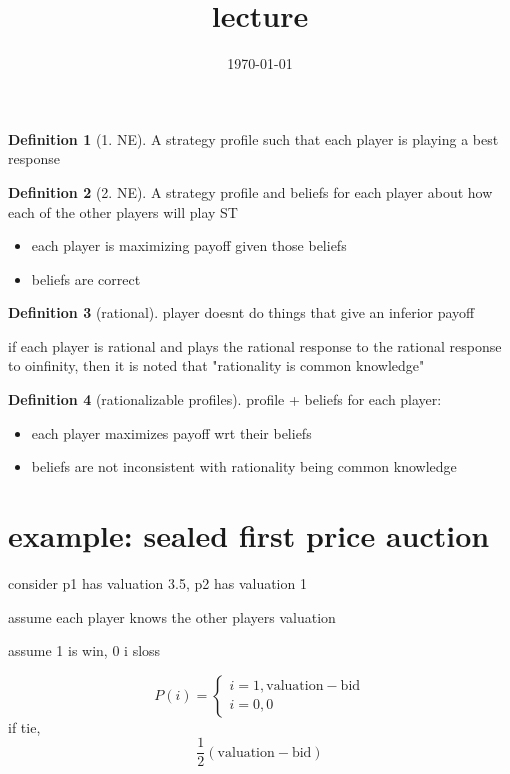 \documentclass{article}
\title{lecture}
\date{\today}
\theoremstyle{definition}
\newtheorem{definition}{Definition}
\begin{document}
\maketitle

\begin{definition}[1. NE]
    A strategy profile such that each player is playing a best response
\end{definition}

\begin{definition}[2. NE]
    A strategy profile and beliefs for each player about how each of the other players will play ST
    \begin{itemize}
        \item each player is maximizing payoff given those beliefs
        \item beliefs are correct
    \end{itemize}
\end{definition}


\begin{definition}[rational]
    player doesnt do things that give an inferior payoff
\end{definition}

if each player is rational and plays the rational response to the rational response to oinfinity, then it is noted that "rationality is common knowledge"

\begin{definition}[rationalizable profiles]
    profile + beliefs for each player:
    \begin{itemize}
        \item each player maximizes payoff wrt their beliefs
        \item beliefs are not inconsistent with rationality being common knowledge
    \end{itemize}
\end{definition}


\section{example: sealed first price auction}

consider p1 has valuation 3.5, p2 has valuation 1

assume each player knows the other players valuation

assume 1 is win, 0 i sloss

\begin{equation}
    P(i)=\begin{cases}
        i=1, \text{valuation}-\text{bid}\\
        i=0, 0
    \end{cases}
\end{equation}
if tie, \begin{equation}
    \frac{1}{2}(\text{valuation}-\text{bid})
\end{equation}
\end{document}
